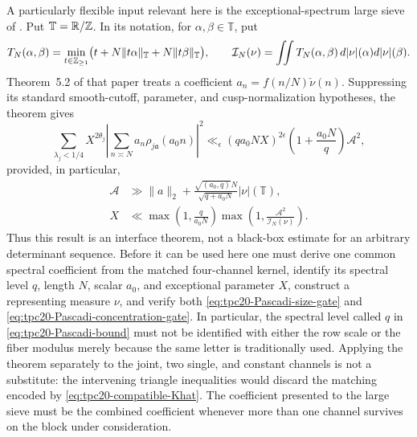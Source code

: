 A particularly flexible input relevant here is the exceptional-spectrum
large sieve of \citet{Pascadi2026LargeSieve}.  Put
\(\mathbb T=\mathbb R/\mathbb Z\).  In its notation, for
\(\alpha,\beta\in\mathbb T\), put
\begin{equation}
 T_N(\alpha,\beta)
 =\min_{t\in\mathbb Z_{\ge1}}\bigl(t+N\lVert t\alpha\rVert_{\mathbb T}
                         +N\lVert t\beta\rVert_{\mathbb T}\bigr),
 \qquad
 \mathcal I_N(\nu)
 =\iint T_N(\alpha,\beta)\,
       d|\nu|(\alpha)d|\nu|(\beta).
 \label{eq:tpc20-Pascadi-functional}
\end{equation}
Theorem~5.2 of that paper treats a coefficient
\(a_n=f(n/N)\check\nu(n)\).  Suppressing its standard smooth-cutoff,
parameter, and cusp-normalization hypotheses, the theorem gives
\begin{equation}
 \sum_{\lambda_j<1/4}X^{2\theta_j}
 \left|\sum_{n\asymp N}a_n\rho_{j\mathfrak a}(a_0n)\right|^2
 \ll_\epsilon
 (qa_0NX)^{2\epsilon}
 \left(1+\frac{a_0N}{q}\right)\mathcal A^2,
 \label{eq:tpc20-Pascadi-bound}
\end{equation}
provided, in particular,
\begin{align}
 \mathcal A
 &\gg \lVert a\rVert_2
 +\frac{\sqrt{(a_0,q)}N}{\sqrt{q+a_0N}}|\nu|(\mathbb T),
 \label{eq:tpc20-Pascadi-size-gate}\\
 X
 &\ll \max\!\left(1,\frac q{a_0N}\right)
       \max\!\left(1,\frac{\mathcal A^2}
                           {\mathcal I_N(\nu)}\right).
 \label{eq:tpc20-Pascadi-concentration-gate}
\end{align}
Thus this result is an interface theorem, not a black-box estimate for
an arbitrary determinant sequence.  Before it can be used here one must
derive one common spectral coefficient from the matched four-channel
kernel, identify its spectral level \(q\), length \(N\), scalar
\(a_0\), and exceptional parameter \(X\), construct a representing
measure \(\nu\), and verify both
\eqref{eq:tpc20-Pascadi-size-gate} and
\eqref{eq:tpc20-Pascadi-concentration-gate}.  In particular, the
spectral level called \(q\) in \eqref{eq:tpc20-Pascadi-bound} must not
be identified with either the row scale or the fiber modulus merely
because the same letter is traditionally used.  Applying the theorem
separately to the joint, two single, and constant channels is not a
substitute: the intervening triangle inequalities would discard the
matching encoded by \eqref{eq:tpc20-compatible-Khat}.  The coefficient
presented to the large sieve must be the combined coefficient whenever
more than one channel survives on the block under consideration.

